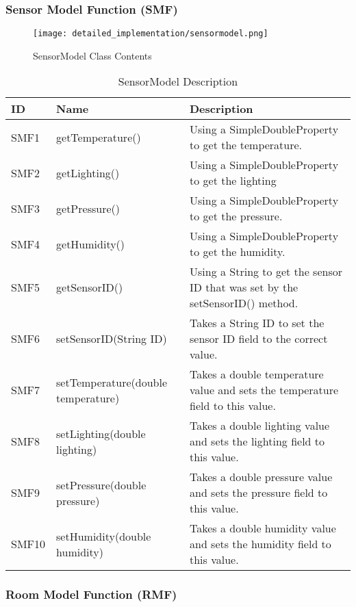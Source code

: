 \documentclass[../document]{subfiles}
\begin{document}
\subsubsection{Sensor Model Function (SMF)}

\begin{figure}[H]
\centering
\texttt{[image: detailed\_implementation/sensormodel.png]}
\caption{SensorModel Class Contents}
\end{figure}

\begin{table}[H]
\caption{SensorModel Description}
\centering
\begin{tabularx}{\textwidth}{|l|l|X|}
	\hline
	ID
	&Name
	&Description
	\\ \hline SMF1 
	&getTemperature()
	&Using a SimpleDoubleProperty to get the temperature.
	\\ \hline SMF2
	&getLighting()
	&Using a SimpleDoubleProperty to get the lighting
	\\ \hline SMF3
	&getPressure()
	&Using a SimpleDoubleProperty to get the pressure.
	\\ \hline SMF4
	&getHumidity()
	&Using a SimpleDoubleProperty to get the humidity.
	\\ \hline SMF5
	&getSensorID()
	&Using a String to get the sensor ID that was set by the setSensorID() method.
	\\ \hline SMF6
	&setSensorID(String ID)
	&Takes a String ID to set the sensor ID field to the correct value.
	\\ \hline SMF7
	&setTemperature(double temperature)
	&Takes a double temperature value and sets the temperature field to this value.
	\\ \hline SMF8
	&setLighting(double lighting)
	&Takes a double lighting value and sets the lighting field to this value.
	\\ \hline SMF9
	&setPressure(double pressure)
	&Takes a double pressure value and sets the pressure field to this value.
	\\ \hline SMF10
	&setHumidity(double humidity)
	&Takes a double humidity value and sets the humidity field to this value.
	\\ \hline 
\end{tabularx}
\end{table}

\subsubsection{Room Model Function (RMF)}
\end{document}
